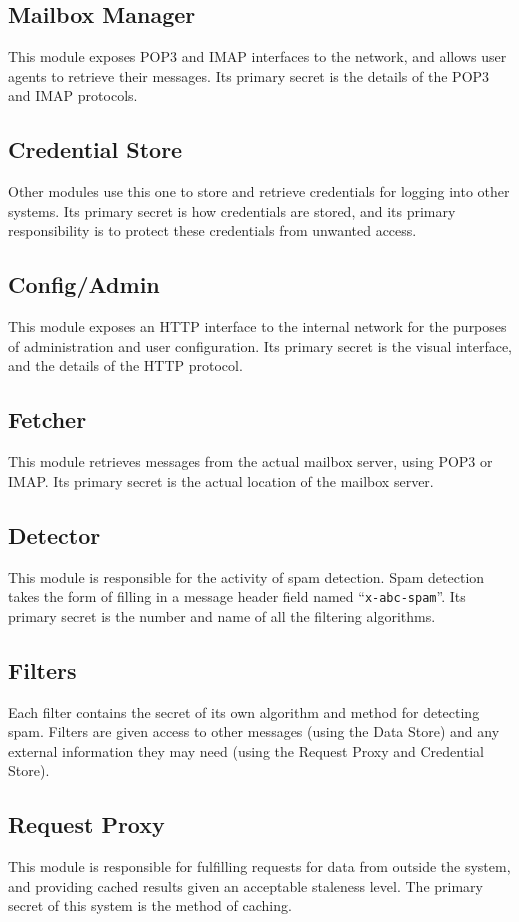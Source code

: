 \documentclass[11pt,letterpaper]{article}
\begin{document}
\subsection{Mailbox Manager}
This module exposes POP3 and IMAP interfaces to the network, and allows user
agents to retrieve their messages.  Its primary secret is the details of the
POP3 and IMAP protocols.

\subsection{Credential Store}
Other modules use this one to store and retrieve credentials for logging into
other systems.  Its primary secret is how credentials are stored, and its
primary responsibility is to protect these credentials from unwanted access.

\subsection{Config/Admin}
This module exposes an HTTP interface to the internal network for the purposes
of administration and user configuration.  Its primary secret is the visual
interface, and the details of the HTTP protocol.

\subsection{Fetcher}
This module retrieves messages from the actual mailbox server, using POP3 or
IMAP.  Its primary secret is the actual location of the mailbox server.

\subsection{Detector}
This module is responsible for the activity of spam detection.  Spam detection
takes the form of filling in a message header field named
``\texttt{x-abc-spam}''.  Its primary secret is the number and name of all the
filtering algorithms.

\subsection{Filters}
Each filter contains the secret of its own algorithm and method for detecting
spam.  Filters are given access to other messages (using the Data Store) and
any external information they may need (using the Request Proxy and Credential
Store).

\subsection{Request Proxy}
This module is responsible for fulfilling requests for data from outside the
system, and providing cached results given an acceptable staleness level.  The
primary secret of this system is the method of caching.
\end{document}
